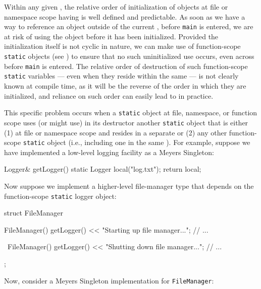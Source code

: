 Within any given , the relative order of initialization
of objects at file or namespace scope having  is
well defined and predictable. As soon as we have a way to reference an
object outside of the current , before \lstinline!main! is
entered, we are at risk of using the object before it has been
initialized. Provided the initialization itself is not cyclic in nature,
we can make use of function-scope \lstinline!static! objects (see ) to
ensure that no such uninitialized use occurs, even across 
before \lstinline!main! is entered. The relative order of destruction
of such function-scope \lstinline!static! variables --- even when they
reside within the same  --- is not clearly known at compile time,
as it will be the reverse of the order in which they are initialized, and
reliance on such order can easily lead to  in
practice.

This specific problem occurs when a \lstinline!static! object at file,
namespace, or function scope uses (or might use) in its destructor
another \lstinline!static! object that is either (1) at file or namespace
scope and resides in a separate  or (2) any other
function-scope \lstinline!static! object (i.e., including one in the same
). For example, suppose we have implemented a low-level
logging facility as a Meyers Singleton:

\begin{emcppslisting}[emcppsbatch=e15]
Logger& getLogger()
{
    static Logger local("log.txt");
    return local;
}
\end{emcppslisting}

\noindent Now suppose we implement a higher-level file-manager type that depends
on the function-scope \lstinline!static! logger object:

\begin{emcppslisting}[emcppsbatch=e15]
struct FileManager
{
    FileManager()
    {
         getLogger() << "Starting up file manager...";
         // ...
    }

    ~FileManager()
    {
        getLogger() << "Shutting down file manager...";
        // ...
    }
};
\end{emcppslisting}

\noindent Now, consider a Meyers Singleton implementation for
\lstinline!FileManager!:

